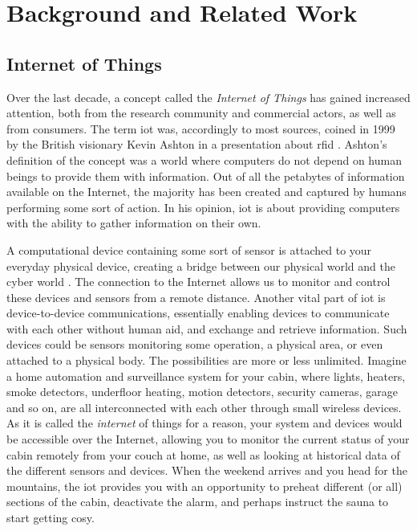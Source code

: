 \chapter{Background and Related Work}
\label{chp:background}

\section{Internet of Things}
\label{sec:iot}

Over the last decade, a concept called the \emph{Internet of Things} has gained increased attention, both from the research community and commercial actors, as well as from consumers. The term \gls{iot} was, accordingly to most sources, coined in 1999 by the British visionary Kevin Ashton in a presentation about \gls{rfid} \cite{iot-phrase-2} \cite{iot-phrase-1}. Ashton's definition of the concept was a world where computers do not depend on human beings to provide them with information. Out of all the petabytes of information available on the Internet, the majority has been created and captured by humans performing some sort of action. In his opinion, \gls{iot} is about providing computers with the ability to gather information on their own.


A computational device containing some sort of sensor is attached to your everyday physical device, creating a bridge between our physical world and the cyber world \cite{Kopetz2011}. The connection to the Internet allows us to monitor and control these devices and sensors from a remote distance. Another vital part of \gls{iot} is device-to-device communications, essentially enabling devices to communicate with each other without human aid, and exchange and retrieve information. Such devices could be sensors monitoring some operation, a physical area, or even attached to a physical body. The possibilities are more or less unlimited. Imagine a home automation and surveillance system for your cabin, where lights, heaters, smoke detectors, underfloor heating, motion detectors, security cameras, garage and so on, are all interconnected with each other through small wireless devices. As it is called the \emph{internet} of things for a reason, your system and devices would be accessible over the Internet, allowing you to monitor the current status of your cabin remotely from your couch at home, as well as looking at historical data of the different sensors and devices. When the weekend arrives and you head for the mountains, the \gls{iot} provides you with an opportunity to preheat different (or all) sections of the cabin, deactivate the alarm, and perhaps instruct the sauna to start getting cosy. 


